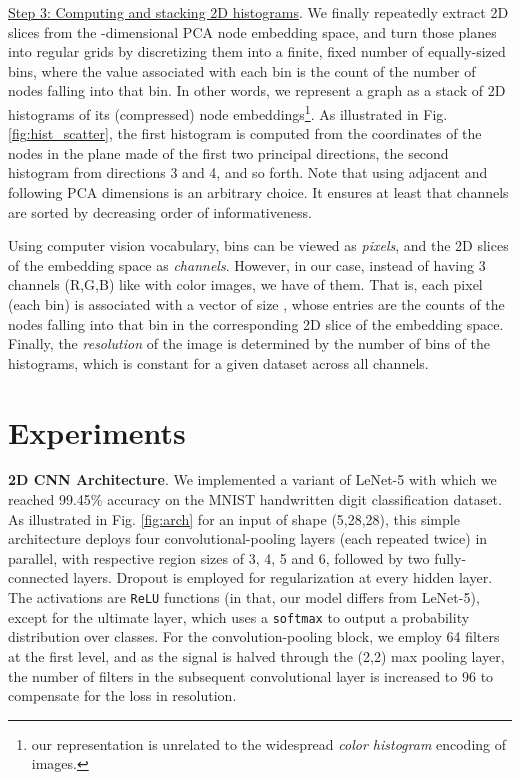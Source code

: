 \documentclass[runningheads]{llncs}
\begin{document}
\underline{Step 3: Computing and stacking 2D histograms}. We finally repeatedly extract 2D slices from the -dimensional PCA node embedding space, and turn those planes into regular grids by discretizing them into a finite, fixed number of equally-sized bins, where the value associated with each bin is the count of the number of nodes falling into that bin. In other words, we represent a graph as a stack of  2D histograms of its (compressed) node embeddings\footnote{\scriptsize{our representation is unrelated to the widespread \textit{color histogram} encoding of images.}}. As illustrated in Fig. \ref{fig:hist_scatter}, the first histogram is computed from the coordinates of the nodes in the plane made of the first two principal directions, the second histogram from directions 3 and 4, and so forth. Note that using adjacent and following PCA dimensions is an arbitrary choice. It ensures at least that channels are sorted by decreasing order of informativeness.

Using computer vision vocabulary, bins can be viewed as \textit{pixels}, and the 2D slices of the embedding space as \textit{channels}. However, in our case, instead of having 3 channels (R,G,B) like with color images,  we have  of them. That is, each pixel (each bin) is associated with a vector of size , whose entries are the counts of the nodes falling into that bin in the corresponding 2D slice of the embedding space. Finally, the \textit{resolution} of the image is determined by the number of bins of the histograms, which is constant for a given dataset across all channels.

\section{Experiments}

\noindent \textbf{2D CNN Architecture}.
We implemented a variant of LeNet-5 \cite{lecun1998gradient} with which we reached 99.45\% accuracy on the MNIST handwritten digit classification dataset. As illustrated in Fig. \ref{fig:arch} for an input of shape (5,28,28), this simple architecture deploys four convolutional-pooling layers (each repeated twice) in parallel, with respective region sizes of 3, 4, 5 and 6, followed by two fully-connected layers. Dropout \cite{srivastava2014dropout} is employed for regularization at every hidden layer. The activations are \texttt{ReLU} functions (in that, our model differs from LeNet-5), except for the ultimate layer, which uses a \texttt{softmax} to output a probability distribution over classes. For the convolution-pooling block, we employ 64 filters at the first level, and as the signal is halved through the (2,2) max pooling layer, the number of filters in the subsequent convolutional layer is increased to 96 to compensate for the loss in resolution.
\end{document}
